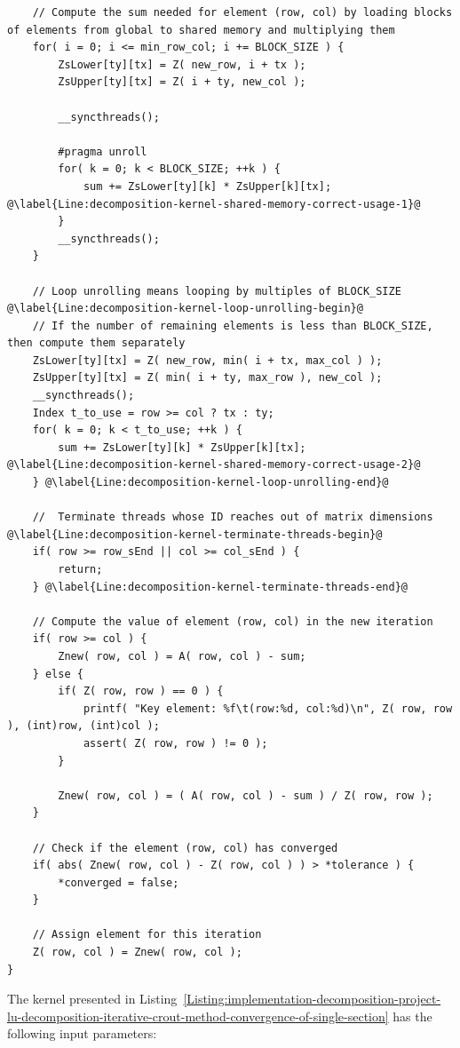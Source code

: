 \begin{lstlisting}
	// Compute the sum needed for element (row, col) by loading blocks of elements from global to shared memory and multiplying them
	for( i = 0; i <= min_row_col; i += BLOCK_SIZE ) {
		ZsLower[ty][tx] = Z( new_row, i + tx );
		ZsUpper[ty][tx] = Z( i + ty, new_col );
		
		__syncthreads();
		
		#pragma unroll
		for( k = 0; k < BLOCK_SIZE; ++k ) {
			sum += ZsLower[ty][k] * ZsUpper[k][tx]; @\label{Line:decomposition-kernel-shared-memory-correct-usage-1}@
		}
		__syncthreads();
	}
	
	// Loop unrolling means looping by multiples of BLOCK_SIZE @\label{Line:decomposition-kernel-loop-unrolling-begin}@
	// If the number of remaining elements is less than BLOCK_SIZE, then compute them separately
	ZsLower[ty][tx] = Z( new_row, min( i + tx, max_col ) );
	ZsUpper[ty][tx] = Z( min( i + ty, max_row ), new_col );
	__syncthreads();
	Index t_to_use = row >= col ? tx : ty;
	for( k = 0; k < t_to_use; ++k ) {
		sum += ZsLower[ty][k] * ZsUpper[k][tx]; @\label{Line:decomposition-kernel-shared-memory-correct-usage-2}@
	} @\label{Line:decomposition-kernel-loop-unrolling-end}@
	
	//  Terminate threads whose ID reaches out of matrix dimensions @\label{Line:decomposition-kernel-terminate-threads-begin}@
	if( row >= row_sEnd || col >= col_sEnd ) {
		return;
	} @\label{Line:decomposition-kernel-terminate-threads-end}@
	
	// Compute the value of element (row, col) in the new iteration
	if( row >= col ) {
		Znew( row, col ) = A( row, col ) - sum;
	} else {
		if( Z( row, row ) == 0 ) {
			printf( "Key element: %f\t(row:%d, col:%d)\n", Z( row, row ), (int)row, (int)col );
			assert( Z( row, row ) != 0 );
		}

		Znew( row, col ) = ( A( row, col ) - sum ) / Z( row, row );
	}
	
	// Check if the element (row, col) has converged
	if( abs( Znew( row, col ) - Z( row, col ) ) > *tolerance ) {
		*converged = false;
	}
	
	// Assign element for this iteration
	Z( row, col ) = Znew( row, col );
}
\end{lstlisting}

The kernel presented in Listing~\ref{Listing:implementation-decomposition-project-lu-decomposition-iterative-crout-method-convergence-of-single-section} has the following input parameters:


